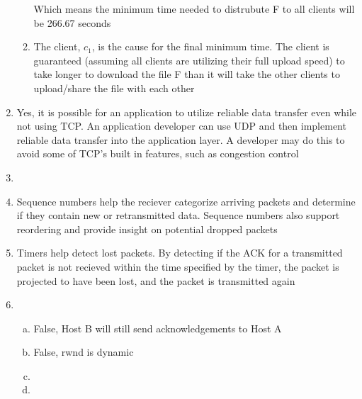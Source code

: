 \documentclass[14pt]{article}
\begin{document}
\begin{enumerate}
\begin{enumerate}[(1)]
Which means the minimum time needed to distrubute F to all clients will be 266.67 seconds \\

\item
The client, $c_1$, is the cause for the final minimum time. The client is guaranteed (assuming all clients are utilizing their full upload speed) to take longer to download the file F than it will take the other clients to upload/share the file with each other \\
\end{enumerate}

\item
Yes, it is possible for an application to utilize reliable data transfer even while not using TCP. An application developer can use UDP and then implement reliable data transfer into the application layer. A developer may do this to avoid some of TCP's built in features, such as congestion control \\

\item


\item
Sequence numbers help the reciever categorize arriving packets and determine if they contain new or retransmitted data. Sequence numbers also support reordering and provide insight on potential dropped packets \\

\item
Timers help detect lost packets. By detecting if the ACK for a transmitted packet is not recieved within the time specified by the timer, the packet is projected to have been lost, and the packet is transmitted again \\

\item
\begin{enumerate}[(a)]
\item
False, Host B will still send acknowledgements to Host A

\item
False, rwnd is dynamic

\item

\item


\end{enumerate}

\end{enumerate}
\end{document}
